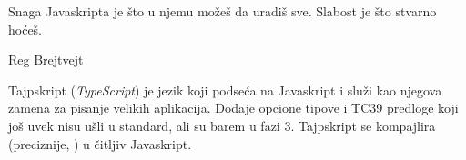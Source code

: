 \epigraph{
  Snaga Javaskripta je što u njemu možeš da uradiš sve.
  Slabost je što stvarno hoćeš.
}{Reg Brejtvejt}

Tajpskript (\textsl{TypeScript}) je jezik koji podseća na Javaskript i služi kao njegova zamena za pisanje velikih aplikacija.
Dodaje opcione tipove i TC39 predloge koji još uvek nisu ušli u standard, ali su barem u fazi 3.
Tajpskript se kompajlira (preciznije, ) u čitljiv Javaskript.






